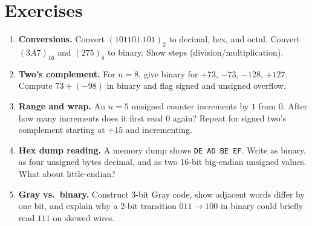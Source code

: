 \section{Exercises}
\label{sec:ch01-exercises}
\begin{enumerate}[label=E1.\arabic*, leftmargin=*, itemsep=0.8em]
    \item \textbf{Conversions.} Convert $(101101.101)_2$ to decimal, hex, and octal. Convert $(3A7)_{16}$ and $(275)_8$ to binary. Show steps (division/multiplication).
    \item \textbf{Two's complement.} For $n=8$, give binary for $+73$, $-73$, $-128$, $+127$. Compute $73+(-98)$ in binary and flag signed and unsigned overflow.
    \item \textbf{Range and wrap.} An $n=5$ unsigned counter increments by $1$ from $0$. After how many increments does it first read $0$ again? Repeat for signed two's complement starting at $+15$ and incrementing.
    \item \textbf{Hex dump reading.} A memory dump shows \texttt{DE AD BE EF}. Write as binary, as four unsigned bytes decimal, and as two 16-bit big-endian unsigned values. What about little-endian?
    \item \textbf{Gray vs.\ binary.} Construct 3-bit Gray code, show adjacent words differ by one bit, and explain why a 2-bit transition $011\to100$ in binary could briefly read $111$ on skewed wires.
\end{enumerate}
